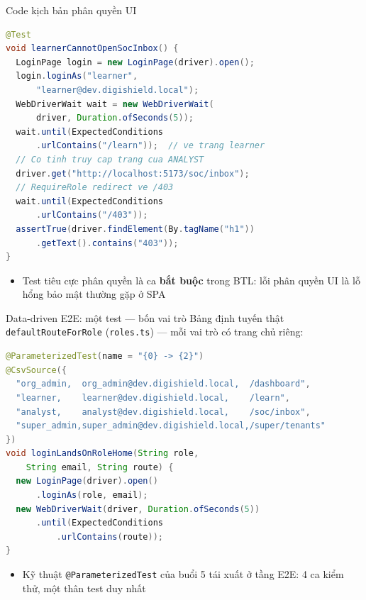 \documentclass[aspectratio=169,12pt]{beamer}
\begin{document}
\begin{frame}[fragile]{Code kịch bản phân quyền UI}
\begin{lstlisting}[language=Java,basicstyle=\ttfamily\scriptsize]
@Test
void learnerCannotOpenSocInbox() {
  LoginPage login = new LoginPage(driver).open();
  login.loginAs("learner",
      "learner@dev.digishield.local");
  WebDriverWait wait = new WebDriverWait(
      driver, Duration.ofSeconds(5));
  wait.until(ExpectedConditions
      .urlContains("/learn"));  // ve trang learner
  // Co tinh truy cap trang cua ANALYST
  driver.get("http://localhost:5173/soc/inbox");
  // RequireRole redirect ve /403
  wait.until(ExpectedConditions
      .urlContains("/403"));
  assertTrue(driver.findElement(By.tagName("h1"))
      .getText().contains("403"));
}
\end{lstlisting}

  \begin{itemize}
    \item Test tiêu cực phân quyền là ca \textbf{bắt buộc} trong BTL:
          lỗi phân quyền UI là lỗ hổng bảo mật thường gặp ở SPA
  \end{itemize}
\end{frame}

\begin{frame}[fragile]{Data-driven E2E: một test --- bốn vai trò}
  Bảng định tuyến thật \texttt{defaultRouteForRole}
  (\texttt{roles.ts}) --- mỗi vai trò có trang chủ riêng:

\begin{lstlisting}[language=Java,basicstyle=\ttfamily\scriptsize]
@ParameterizedTest(name = "{0} -> {2}")
@CsvSource({
  "org_admin,  org_admin@dev.digishield.local,  /dashboard",
  "learner,    learner@dev.digishield.local,    /learn",
  "analyst,    analyst@dev.digishield.local,    /soc/inbox",
  "super_admin,super_admin@dev.digishield.local,/super/tenants"
})
void loginLandsOnRoleHome(String role,
    String email, String route) {
  new LoginPage(driver).open()
      .loginAs(role, email);
  new WebDriverWait(driver, Duration.ofSeconds(5))
      .until(ExpectedConditions
          .urlContains(route));
}
\end{lstlisting}

  \begin{itemize}
    \item Kỹ thuật \texttt{@ParameterizedTest} của buổi 5 tái xuất ở
          tầng E2E: 4 ca kiểm thử, một thân test duy nhất
  \end{itemize}
\end{frame}
\end{document}
